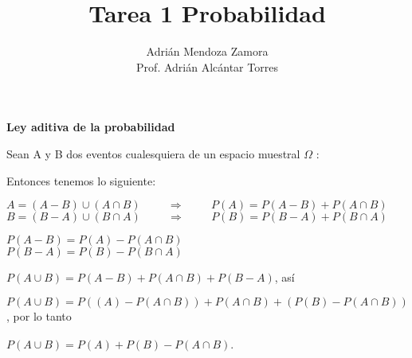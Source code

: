 \documentclass[]{article}
\title{Tarea 1 Probabilidad\\}
\author{Adri\'an Mendoza Zamora
	\\
	Prof. Adri\'an Alc\'antar Torres}
\begin{document}
\maketitle
\begin{center}
\textbf{	Ley aditiva de la probabilidad}
\end{center}

Sean A y B dos eventos cualesquiera de un espacio muestral $\Omega$ :\\

\begin{center}
	\pagestyle{empty}

\def\firstcircle{(0,0) circle (1.5cm)}
\def\thirdcircle{(0:2cm) circle (1.5cm)}


\end{center}

Entonces tenemos lo siguiente:\\

\begin{center}
$A=(A-B) \cup (A \cap B)\hspace{1cm} \Rightarrow\hspace{1cm}P(A)=P(A-B)+P(A \cap B) $\\
$B=(B-A) \cup (B \cap A) \hspace{1cm} \Rightarrow\hspace{1cm} P(B)=P(B-A)+P(B \cap A)$\\
\end{center}
\begin{center}
	$P(A-B)=P(A)-P(A \cap B)$\\
$P(B-A)=P(B)-P(B \cap A)$\\
\end{center}


\begin{flushleft}
	$P(A \cup B)=P(A-B)+ P(A \cap B) + P(B-A)$,  as\'i
\end{flushleft}
$P(A \cup B)=P((A)-P(A \cap B)) + P(A \cap B) + (P(B)-P(A \cap B))$, por lo tanto \\\\
$P(A \cup B)=P(A)+P(B)-P(A \cap B). $
\end{document}
